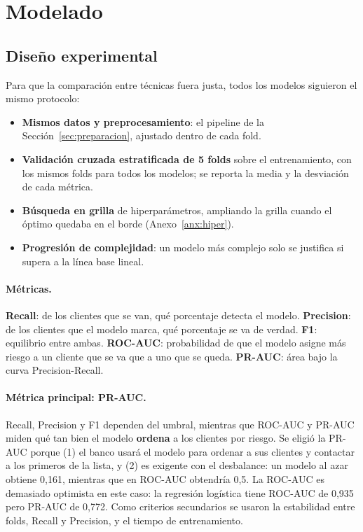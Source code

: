 \documentclass[11pt,a4paper]{article}
\begin{document}
\section{Modelado}
\label{sec:modelado}

\subsection{Diseño experimental}
\label{sec:diseno}

Para que la comparación entre técnicas fuera justa, todos los modelos siguieron el mismo protocolo:
\begin{itemize}
  \item \textbf{Mismos datos y preprocesamiento}: el pipeline de la Sección~\ref{sec:preparacion}, ajustado dentro de cada fold.
  \item \textbf{Validación cruzada estratificada de 5 folds} sobre el entrenamiento, con los mismos folds para todos los modelos; se reporta la media y la desviación de cada métrica.
  \item \textbf{Búsqueda en grilla} de hiperparámetros, ampliando la grilla cuando el óptimo quedaba en el borde (Anexo~\ref{anx:hiper}).
  \item \textbf{Progresión de complejidad}: un modelo más complejo solo se justifica si supera a la línea base lineal.
\end{itemize}

\paragraph{Métricas.} \textbf{Recall}: de los clientes que se van, qué porcentaje detecta el modelo. \textbf{Precision}: de los clientes que el modelo marca, qué porcentaje se va de verdad. \textbf{F1}: equilibrio entre ambas. \textbf{ROC-AUC}: probabilidad de que el modelo asigne más riesgo a un cliente que se va que a uno que se queda. \textbf{PR-AUC}: área bajo la curva Precision-Recall.

\paragraph{Métrica principal: PR-AUC.} Recall, Precision y F1 dependen del umbral, mientras que ROC-AUC y PR-AUC miden qué tan bien el modelo \textbf{ordena} a los clientes por riesgo. Se eligió la PR-AUC porque (1) el banco usará el modelo para ordenar a sus clientes y contactar a los primeros de la lista, y (2) es exigente con el desbalance: un modelo al azar obtiene 0,161, mientras que en ROC-AUC obtendría 0,5. La ROC-AUC es demasiado optimista en este caso: la regresión logística tiene ROC-AUC de 0,935 pero PR-AUC de 0,772. Como criterios secundarios se usaron la estabilidad entre folds, Recall y Precision, y el tiempo de entrenamiento.
\end{document}
